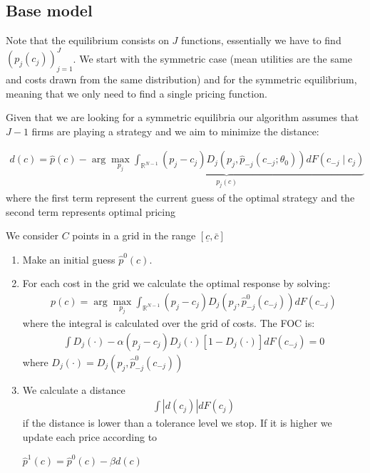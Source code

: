 \documentclass[12pt]{article}
\begin{document}
\subsection{Base model}
Note that the equilibrium consists on $J$ functions, essentially we have to find $(p_j(c_j))_{j=1}^J$. We start with the symmetric case (mean utilities are the same and costs drawn from the same distribution) and for the symmetric equilibrium, meaning that we only need to find a single pricing function. 

Given that we are looking for a symmetric equilibria our algorithm assumes that $J-1$ firms are playing a strategy  and we aim to minimize the distance: 


\begin{align}
    d(c) = \hat{p}(c) -\underbrace{\arg \max_{p_j} \int_{\mathbb{R}^{N-1}}^{} (p_j - c_j) D_j(p_j, \hat{p}_{-j}(c_{-j}; \theta_0)) dF(c_{-j} \mid c_j)}_{p_j(c)}
\end{align} 
where the first term represent the current guess of the optimal strategy and the  second term represents optimal pricing 


We consider $C$ points in a grid in the range $[\underline{c}, \bar{c}] $

\begin{enumerate}
    \item Make an initial guess $\hat{p}^0(c)$. 
    \item For each cost in the grid we calculate the optimal response by solving: 
    \begin{align}
        p(c) = \arg \max_{p_j} \int_{\mathbb{R}^{N-1}}^{} (p_j - c_j) D_j(p_j, \hat{p}^0_{-j}(c_{-j})) dF(c_{-j})
    \end{align}  
    where the integral is calculated over the grid of costs.
    The FOC is:  
    \begin{align}
        \int D_j(\cdot) -\alpha  (p_j - c_j)  D_j(\cdot) [1-D_j(\cdot)] dF(c_{-j}) = 0 
    \end{align} 
    where $D_j(\cdot) = D_j(p_j, \hat{p}^0_{-j}(c_{-j}))$
    

    
    \item We calculate a distance 
    \begin{align}
        \int | d(c_j) | dF(c_j)
    \end{align}
    if the distance is lower than a tolerance level we stop. If it is higher we update each price according to 

    $\hat{p}^1(c) = \hat{p}^0(c) - \beta d(c)$
    
\end{enumerate}
\end{document}
